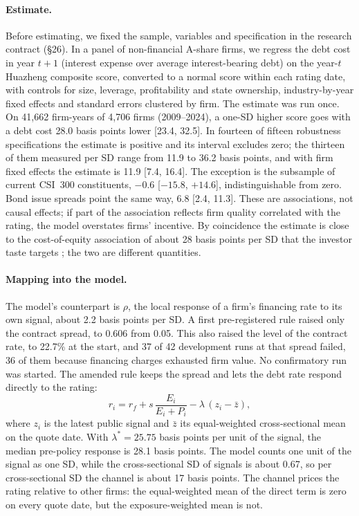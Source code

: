 \documentclass[11pt]{article}
\begin{document}
\paragraph{Estimate.} Before estimating, we fixed the sample, variables and specification in the research contract (\S26). In a panel of non-financial A-share firms, we regress the debt cost in year $t+1$ (interest expense over average interest-bearing debt) on the year-$t$ Huazheng composite score, converted to a normal score within each rating date, with controls for size, leverage, profitability and state ownership, industry-by-year fixed effects and standard errors clustered by firm. The estimate was run once. On 41,662 firm-years of 4,706 firms (2009--2024), a one-SD higher score goes with a debt cost 28.0 basis points lower [23.4, 32.5]. In fourteen of fifteen robustness specifications the estimate is positive and its interval excludes zero; the thirteen of them measured per SD range from 11.9 to 36.2 basis points, and with firm fixed effects the estimate is 11.9 [7.4, 16.4]. The exception is the subsample of current CSI~300 constituents, $-0.6$ [$-15.8$, $+14.6$], indistinguishable from zero. Bond issue spreads point the same way, 6.8 [2.4, 11.3]. These are associations, not causal effects; if part of the association reflects firm quality correlated with the rating, the model overstates firms' incentive. By coincidence the estimate is close to the cost-of-equity association of about 28 basis points per SD that the investor taste targets \citep{zhao2024esg}; the two are different quantities.

\paragraph{Mapping into the model.} The model's counterpart is $\rho$, the local response of a firm's financing rate to its own signal, about 2.2 basis points per SD. A first pre-registered rule raised only the contract spread, to 0.606 from 0.05. This also raised the level of the contract rate, to 22.7\% at the start, and 37 of 42 development runs at that spread failed, 36 of them because financing charges exhausted firm value. No confirmatory run was started. The amended rule keeps the spread and lets the debt rate respond directly to the rating:
\[
r_i = r_f + s\,\frac{E_i}{E_i+P_i} - \lambda\,(z_i - \bar z),
\]
where $z_i$ is the latest public signal and $\bar z$ its equal-weighted cross-sectional mean on the quote date. With $\lambda^* = 25.75$ basis points per unit of the signal, the median pre-policy response is 28.1 basis points. The model counts one unit of the signal as one SD, while the cross-sectional SD of signals is about 0.67, so per cross-sectional SD the channel is about 17 basis points. The channel prices the rating relative to other firms: the equal-weighted mean of the direct term is zero on every quote date, but the exposure-weighted mean is not.
\end{document}
